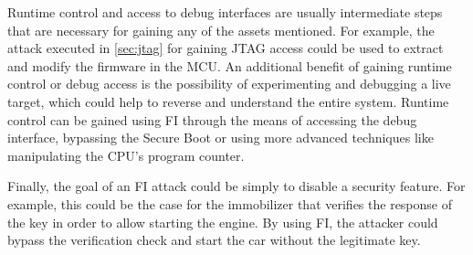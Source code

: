 \documentclass[a4paper, 10pt]{article}
\begin{document}
Runtime control and access to debug interfaces are usually intermediate steps that are necessary for gaining any of the assets mentioned. For example, the attack executed in \autoref{sec:jtag} for gaining JTAG access could be used to extract and modify the firmware in the MCU. An additional benefit of gaining runtime control or debug access is the possibility of experimenting and debugging a live target, which could help to reverse and understand the entire system. Runtime control can be gained using FI through the means of accessing the debug interface, bypassing the Secure Boot or using more advanced techniques like manipulating the CPU's program counter.

Finally, the goal of an FI attack could be simply to disable a security feature. For example, this could be the case for the immobilizer that verifies the response of the key in order to allow starting the engine. By using FI, the attacker could bypass the verification check and start the car without the legitimate key.




\end{document}

